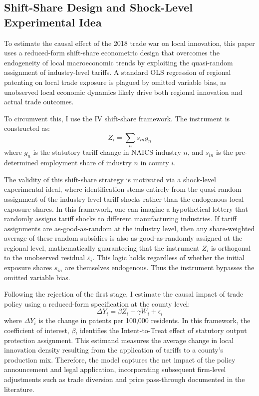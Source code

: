 \documentclass[12pt]{article}
\numberwithin{figure}{section}
\numberwithin{table}{section}
\begin{document}

\newpage
\subsection{Shift-Share Design and Shock-Level Experimental Idea}

To estimate the causal effect of the 2018 trade war on local innovation, this paper uses a reduced-form shift-share econometric design that overcomes the endogeneity of local macroeconomic trends by exploiting the quasi-random assignment of industry-level tariffs. A standard OLS regression of regional patenting on local trade exposure is plagued by omitted variable bias, as unobserved local economic dynamics likely drive both regional innovation and actual trade outcomes. 

To circumvent this, I use the \cite{BHJ2022} IV shift-share framework. The instrument is constructed as:
$$ Z_i = \sum_n s_{in} g_n $$
where $g_n$ is the statutory tariff change in NAICS industry $n$, and $s_{in}$ is the pre-determined employment share of industry $n$ in county $i$. 

The validity of this shift-share strategy is motivated via a shock-level experimental ideal, where identification stems entirely from the quasi-random assignment of the industry-level tariff shocks rather than the endogenous local exposure shares. In this framework, one can imagine a hypothetical lottery that randomly assigns tariff shocks to different manufacturing industries. If  tariff assignments are as-good-as-random at the industry level, then any share-weighted average of these random subsidies is also as-good-as-randomly assigned at the regional level, mathematically guaranteeing that the instrument $Z_i$ is orthogonal to the unobserved residual $\varepsilon_i$. This logic holds regardless of whether the initial exposure shares $s_{in}$ are themselves endogenous. Thus the instrument bypasses the omitted variable bias.

Following the rejection of the first stage, I estimate the causal impact of trade policy using a reduced-form specification at the county level:
$$\Delta Y_i = \beta Z_i + \gamma W_i + \epsilon_i $$where $\Delta Y_i$ is the change in patents per 100,000 residents. In this framework, the coefficient of interest, $\beta$, identifies the Intent-to-Treat effect of statutory output protection assignment. This estimand measures the average change in local innovation density resulting from the application of tariffs to a county’s production mix. Therefore, the model captures the net impact of the policy announcement and legal application, incorporating subsequent firm-level adjustments such as trade diversion and price pass-through documented in the literature.
\end{document}
